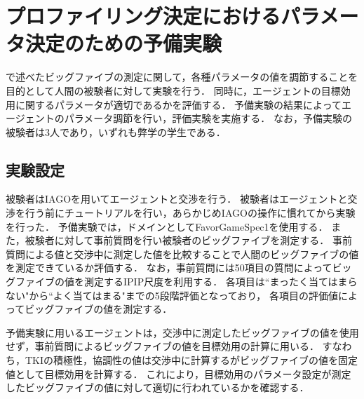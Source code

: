 

\chapter{プロファイリング決定におけるパラメータ決定のための予備実験}
で述べたビッグファイブの測定に関して，各種パラメータの値を調節することを目的として人間の被験者に対して実験を行う．
同時に，エージェントの目標効用に関するパラメータが適切であるかを評価する．
予備実験の結果によってエージェントのパラメータ調節を行い，評価実験を実施する．
なお，予備実験の被験者は3人であり，いずれも弊学の学生である．

\section{実験設定}
被験者はIAGOを用いてエージェントと交渉を行う．
被験者はエージェントと交渉を行う前にチュートリアルを行い，あらかじめIAGOの操作に慣れてから実験を行った．
予備実験では，ドメインとしてFavorGameSpec1を使用する．
また，被験者に対して事前質問を行い被験者のビッグファイブを測定する．
事前質問による値と交渉中に測定した値を比較することで人間のビッグファイブの値を測定できているか評価する．
なお，事前質問には50項目の質問によってビッグファイブの値を測定するIPIP尺度を利用する．
各項目は``まったく当てはまらない"から``よく当てはまる"までの5段階評価となっており，
各項目の評価値によってビッグファイブの値を測定する．

予備実験に用いるエージェントは，交渉中に測定したビッグファイブの値を使用せず，事前質問によるビッグファイブの値を目標効用の計算に用いる．
すなわち，TKIの積極性，協調性の値は交渉中に計算するがビッグファイブの値を固定値として目標効用を計算する．
これにより，目標効用のパラメータ設定が測定したビッグファイブの値に対して適切に行われているかを確認する．

